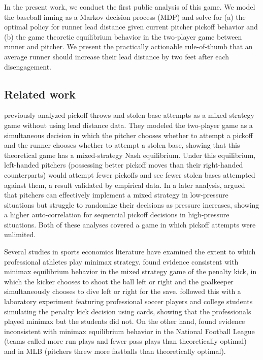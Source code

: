 \documentclass{article}
\begin{document}
    In the present work, we conduct the first public analysis of this game. We model the baseball inning as a Markov decision process (MDP) and solve for (a) the optimal policy for runner lead distance given current pitcher pickoff behavior and (b) the game theoretic equilibrium behavior in the two-player game between runner and pitcher. We present the practically actionable rule-of-thumb that an average runner should increase their lead distance by two feet after each disengagement.

    \subsection{Related work}

    \textcite{downey_pick_2015} previously analyzed pickoff throws and stolen base attempts as a mixed strategy game without using lead distance data. They modeled the two-player game as a simultaneous decision in which the pitcher chooses whether to attempt a pickoff and the runner chooses whether to attempt a stolen base, showing that this theoretical game has a mixed-strategy Nash equilibrium. Under this equilibrium, left-handed pitchers (possessing better pickoff moves than their right-handed counterparts) would attempt fewer pickoffs and see fewer stolen bases attempted against them, a result validated by empirical data. In a later analysis, \textcite{downey_pressure_2019} argued that pitchers can effectively implement a mixed strategy in low-pressure situations but struggle to randomize their decisions as pressure increases, showing a higher auto-correlation for sequential pickoff decisions in high-pressure situations. Both of these analyses covered a game in which pickoff attempts were unlimited.

    Several studies in sports economics literature have examined the extent to which professional athletes play minimax strategy. \textcite{palacios-huerta_professionals_2003} found evidence consistent with minimax equilibrium behavior in the mixed strategy game of the penalty kick, in which the kicker chooses to shoot the ball left or right and the goalkeeper simultaneously chooses to dive left or right for the save. \textcite{palacios-huerta_experientia_2008} followed this with a laboratory experiment featuring professional soccer players and college students simulating the penalty kick decision using cards, showing that the professionals played minimax but the students did not. On the other hand, \textcite{kovash_professionals_2009} found evidence inconsistent with minimax equilibrium behavior in the National Football League (teams called more run plays and fewer pass plays than theoretically optimal) and in MLB (pitchers threw more fastballs than theoretically optimal).
\end{document}
